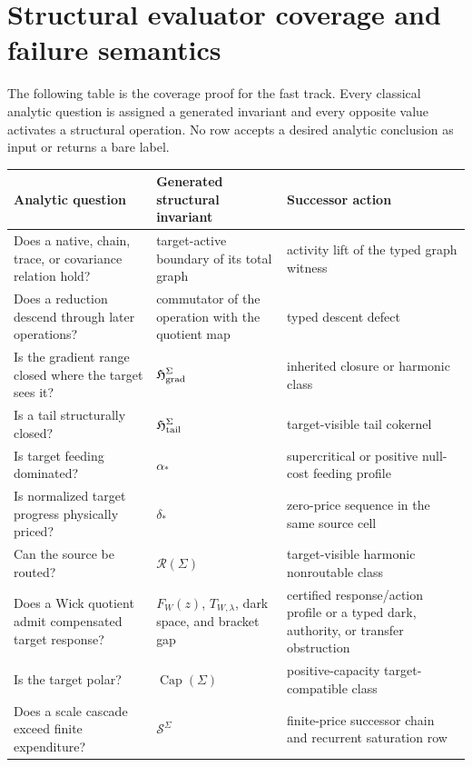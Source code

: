 \documentclass[11pt]{article}
\numberwithin{section}{part}
\theoremstyle{plain}
\theoremstyle{definition}
\theoremstyle{remark}
\begin{document}
\FloatBarrier

\section{Structural evaluator coverage and failure semantics}
\label{sec:invariant-hierarchy}

The following table is the coverage proof for the fast track.  Every
classical analytic question is assigned a generated invariant and every
opposite value activates a structural operation.  No row accepts a desired
analytic conclusion as input or returns a bare label.

\begin{center}
\begin{tabular}{p{.25\linewidth}p{.33\linewidth}p{.32\linewidth}}
\toprule
Analytic question & Generated structural invariant & Successor action\\
\midrule
Does a native, chain, trace, or covariance relation hold? & target-active boundary
of its total graph & activity lift of the typed graph witness\\
Does a reduction descend through later operations? & commutator of the
operation with the quotient map & typed descent defect\\
Is the gradient range closed where the target sees it? &
\(\mathfrak H_{\rm grad}^{\Sigma}\) & inherited closure or harmonic class\\
Is a tail structurally closed? & \(\mathfrak H_{\rm tail}^{\Sigma}\) &
target-visible tail cokernel\\
Is target feeding dominated? & \(\alpha_*\) & supercritical or positive
null-cost feeding profile\\
Is normalized target progress physically priced? & \(\delta_*\) & zero-price
sequence in the same source cell\\
Can the source be routed? & \(\mathcal R(\Sigma)\) & target-visible harmonic
nonroutable class\\
Does a Wick quotient admit compensated target response? &
\(F_W(z)\), \(T_{W,\lambda}\), dark space, and bracket gap &
certified response/action profile or a typed dark, authority, or transfer
obstruction\\
Is the target polar? & \(\operatorname{Cap}(\Sigma)\) & positive-capacity
target-compatible class\\
Does a scale cascade exceed finite expenditure? & \(\mathscr S^\Sigma\) &
finite-price successor chain and recurrent saturation row\\

\end{tabular}
\end{center}
\end{document}
